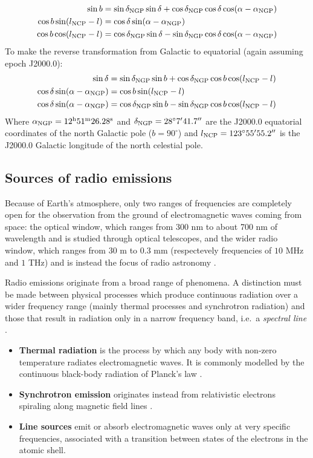 \begin{align}
    \sin b &= \sin \delta_{\text{NGP}} \sin \delta + \cos \delta_{\text{NGP}} \cos \delta \cos (\alpha - \alpha_{\text{NGP}}) \\
    \cos b \sin(l_{\text{NCP}} - l) &= \cos \delta \sin(\alpha - \alpha_{\text{NGP}}) \\
    \cos b \cos (l_{\text{NCP}} - l) &= \cos \delta_{\text{NGP}} \sin \delta - \sin \delta_{\text{NGP}} \cos \delta \cos(\alpha - \alpha_{\text{NGP}})
\end{align}
To make the reverse transformation from Galactic to equatorial (again assuming epoch J2000.0):
\begin{align}
    \sin \delta &= \sin \delta_{\text{NGP}} \sin b + \cos \delta_{\text{NGP}} \cos b \cos (l_{\text{NCP}} - l) \\
    \cos \delta \sin(\alpha - \alpha_{\text{NGP}}) &= \cos b \sin(l_{\text{NCP}} - l) \\
    \cos \delta \sin(\alpha - \alpha_{\text{NGP}}) &= \cos \delta_{\text{NGP}} \sin b - \sin \delta_{\text{NGP}} \cos b \cos (l_{\text{NCP}} - l)
\end{align}
Where $\alpha_{\text{NGP}} = 12^{\text{h}} 51^{\text{m}} 26.28^{\text{s}}$ and $\delta_{\text{NGP}} = 28^{\circ}7' 41.7''$ are the J2000.0 equatorial coordinates of the north Galactic pole ($b = 90^{\circ}$) and $l_{\text{NCP}} = 123^{\circ} 55' 55.2''$ is the J2000.0 Galactic longitude of the north celestial pole.

\subsection{Sources of radio emissions}
Because of Earth's atmosphere, only two ranges of frequencies are completely open for the observation from the ground of electromagnetic waves coming from space: the optical window, which ranges from 300 nm to about 700 nm of wavelength and is studied through optical telescopes, and the wider radio window, which ranges from $30$ m to $0.3$ mm (respectevely frequencies of $10$ MHz and $1$ THz) and is instead the focus of radio astronomy \cite{condon_essential_2016}.

Radio emissions originate from a broad range of phenomena.
A distinction must be made between physical processes which produce continuous radiation over a wider frequency range (mainly thermal processes and synchrotron radiation) and those that result in radiation only in a narrow frequency band, i.e.\ a \emph{spectral line} \cite{lauterbach_radio_2022}.
\begin{itemize}
    \item \textbf{Thermal radiation} is the process by which any body with non-zero temperature radiates electromagnetic waves. It is commonly modelled by the continuous black-body radiation of Planck's law \cite{carroll_introduction_2007}.
    \item \textbf{Synchrotron emission} originates instead from relativistic electrons spiraling along magnetic field lines \cite{maoz_astrophysics_2016}.
    \item \textbf{Line sources} emit or absorb electromagnetic waves only at very specific frequencies, associated with a transition between states of the electrons in the atomic shell.
\end{itemize}

